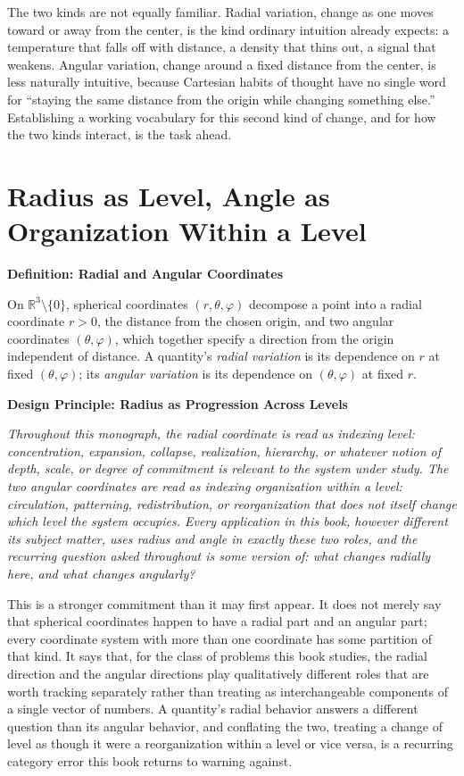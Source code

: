 \documentclass[11pt,fleqn]{book}
\numberwithin{equation}{chapter}
\newenvironment{definition}[1]
  {\begin{definitionEnv}
   \noindent\textbf{Definition: #1}\par\smallskip}
  {\end{definitionEnv}}
\newenvironment{principle}[1]
  {\begin{principleEnv}
   \noindent\textbf{Design Principle: #1}\par\smallskip\itshape}
  {\end{principleEnv}}
\theoremstyle{plain}
\theoremstyle{definition}
\theoremstyle{remark}
\newcommand{\R}{\mathbb{R}}
\providecommand{\enquote}[1]{``#1''}
\begin{document}
The two kinds are not equally familiar. Radial variation, change as one moves toward or away from the center, is the kind ordinary intuition already expects: a temperature that falls off with distance, a density that thins out, a signal that weakens. Angular variation, change around a fixed distance from the center, is less naturally intuitive, because Cartesian habits of thought have no single word for \enquote{staying the same distance from the origin while changing something else.} Establishing a working vocabulary for this second kind of change, and for how the two kinds interact, is the task ahead.

\section{Radius as Level, Angle as Organization Within a Level}

\begin{definition}{Radial and Angular Coordinates}
On \(\R^3\setminus\{0\}\), spherical coordinates \((r,\theta,\varphi)\) decompose a point into a radial coordinate \(r>0\), the distance from the chosen origin, and two angular coordinates \((\theta,\varphi)\), which together specify a direction from the origin independent of distance. A quantity's \emph{radial variation} is its dependence on \(r\) at fixed \((\theta,\varphi)\); its \emph{angular variation} is its dependence on \((\theta,\varphi)\) at fixed \(r\).
\end{definition}

\begin{principle}{Radius as Progression Across Levels}
Throughout this monograph, the radial coordinate is read as indexing \emph{level}: concentration, expansion, collapse, realization, hierarchy, or whatever notion of depth, scale, or degree of commitment is relevant to the system under study. The two angular coordinates are read as indexing \emph{organization within a level}: circulation, patterning, redistribution, or reorganization that does not itself change which level the system occupies. Every application in this book, however different its subject matter, uses radius and angle in exactly these two roles, and the recurring question asked throughout is some version of: what changes radially here, and what changes angularly?
\end{principle}

This is a stronger commitment than it may first appear. It does not merely say that spherical coordinates happen to have a radial part and an angular part; every coordinate system with more than one coordinate has some partition of that kind. It says that, for the class of problems this book studies, the radial direction and the angular directions play qualitatively different roles that are worth tracking separately rather than treating as interchangeable components of a single vector of numbers. A quantity's radial behavior answers a different question than its angular behavior, and conflating the two, treating a change of level as though it were a reorganization within a level or vice versa, is a recurring category error this book returns to warning against.
\end{document}
